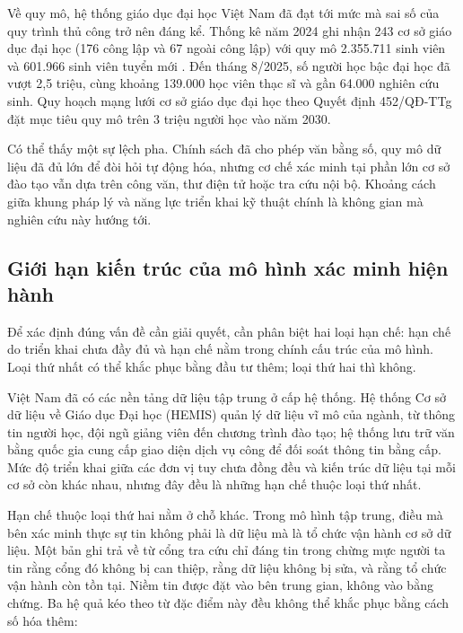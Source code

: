 Về quy mô, hệ thống giáo dục đại học Việt Nam đã đạt tới mức mà sai số của quy trình thủ công trở nên đáng kể. Thống kê năm 2024 ghi nhận 243 cơ sở giáo dục đại học (176 công lập và 67 ngoài công lập) với quy mô 2.355.711 sinh viên và 601.966 sinh viên tuyển mới \cite{MOET_Stats2025}. Đến tháng 8/2025, số người học bậc đại học đã vượt 2,5 triệu, cùng khoảng 139.000 học viên thạc sĩ và gần 64.000 nghiên cứu sinh. Quy hoạch mạng lưới cơ sở giáo dục đại học theo Quyết định 452/QĐ-TTg \cite{QD452_2025} đặt mục tiêu quy mô trên 3 triệu người học vào năm 2030.

Có thể thấy một sự lệch pha. Chính sách đã cho phép văn bằng số, quy mô dữ liệu đã đủ lớn để đòi hỏi tự động hóa, nhưng cơ chế xác minh tại phần lớn cơ sở đào tạo vẫn dựa trên công văn, thư điện tử hoặc tra cứu nội bộ. Khoảng cách giữa khung pháp lý và năng lực triển khai kỹ thuật chính là không gian mà nghiên cứu này hướng tới.

\subsection{Giới hạn kiến trúc của mô hình xác minh hiện hành}

Để xác định đúng vấn đề cần giải quyết, cần phân biệt hai loại hạn chế: hạn chế do triển khai chưa đầy đủ và hạn chế nằm trong chính cấu trúc của mô hình. Loại thứ nhất có thể khắc phục bằng đầu tư thêm; loại thứ hai thì không.

Việt Nam đã có các nền tảng dữ liệu tập trung ở cấp hệ thống. Hệ thống Cơ sở dữ liệu về Giáo dục Đại học (HEMIS) quản lý dữ liệu vĩ mô của ngành, từ thông tin người học, đội ngũ giảng viên đến chương trình đào tạo; hệ thống lưu trữ văn bằng quốc gia cung cấp giao diện dịch vụ công để đối soát thông tin bằng cấp. Mức độ triển khai giữa các đơn vị tuy chưa đồng đều và kiến trúc dữ liệu tại mỗi cơ sở còn khác nhau, nhưng đây đều là những hạn chế thuộc loại thứ nhất.

Hạn chế thuộc loại thứ hai nằm ở chỗ khác. Trong mô hình tập trung, điều mà bên xác minh thực sự tin không phải là dữ liệu mà là tổ chức vận hành cơ sở dữ liệu. Một bản ghi trả về từ cổng tra cứu chỉ đáng tin trong chừng mực người ta tin rằng cổng đó không bị can thiệp, rằng dữ liệu không bị sửa, và rằng tổ chức vận hành còn tồn tại. Niềm tin được đặt vào bên trung gian, không vào bằng chứng. Ba hệ quả kéo theo từ đặc điểm này đều không thể khắc phục bằng cách số hóa thêm:


